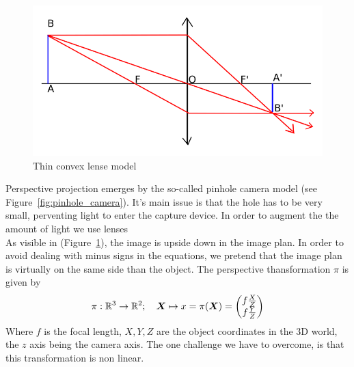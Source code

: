 \begin{figure}[h]
\centering
\includegraphics[width=0.5\columnwidth]{assets/img/convex_lense.png}
\caption{Thin convex lense model}%
\label{fig:convex_lense}
\end{figure}

Perspective projection emerges by the so-called pinhole camera model
(see Figure~\ref{fig:pinhole_camera}).
It's main issue is that the hole has to be very small,
perventing light to enter the capture device.
In order to augment the the amount of light we use lenses\\

As visible in (Figure~\ref{fig:convex_lense}), the image is upside down
in the image plan. In order to avoid dealing with minus signs in the
equations, we pretend that the image plan is virtually on the same
side than the object. The perspective thansformation $\pi$ is given by
\[ \pi : \mathbb{R}^3 \rightarrow \mathbb{R}^2; \quad
	\bm{X} \mapsto x = \pi(\bm{X}) =
	\begin{pmatrix}
		f \frac{X}{Z} \\
		f \frac{Y}{Z} \\
	\end{pmatrix}
\]
Where $f$ is the focal length, $X,Y,Z$ are the object coordinates
in the 3D world, the $z$ axis being the camera axis.
The one challenge we have to overcome, is that this transformation is non linear.\\


